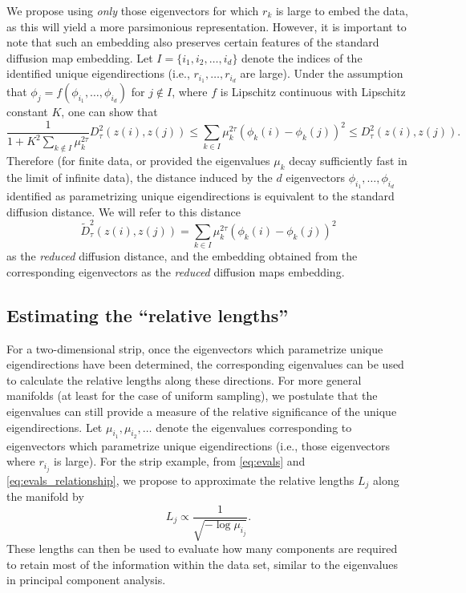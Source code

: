\documentclass[3p]{elsarticle}
\begin{document}
We propose using {\em only} those eigenvectors for which $r_k$ is large to embed the data,
as this will yield a more parsimonious representation.
%
However, it is important to note that such an embedding also preserves certain features of the standard diffusion map embedding.
%
Let $I = \{i_1, i_2, \dots, i_d \}$ denote the indices of the identified unique eigendirections (i.e., $r_{i_1}, \dots, r_{i_d}$ are large).
%
Under the assumption that $\phi_j = f \left( \phi_{i_1}, \dots, \phi_{i_d} \right)$ for $j \not\in I$, where $f$ is Lipschitz continuous with Lipschitz constant $K$, one can show that
\begin{equation}
\frac{1}{1+K^2 \sum_{k \not\in I} \mu_k^{2\tau}} D^2_\tau(z(i), z(j)) \le \sum_{k \in I} \mu_k^{2 \tau} \left( \phi_k(i) - \phi_k(j)  \right)^2 \le D^2_\tau(z(i), z(j)).
\end{equation}
%
Therefore (for finite data, or provided the eigenvalues $\mu_k$ decay sufficiently fast in the limit of infinite data),
the distance induced by the $d$ eigenvectors $\phi_{i_1}, \dots, \phi_{i_d}$ identified as
parametrizing unique eigendirections is equivalent to the standard diffusion distance.
%
We will refer to this distance
\begin{equation}
\tilde{D}^2_\tau(z(i), z(j)) = \sum_{k \in I} \mu_k^{2 \tau} \left( \phi_k(i) - \phi_k(j)  \right)^2
\end{equation}
%
as the {\em reduced} diffusion distance,
and the embedding obtained from the corresponding eigenvectors as the {\em reduced} diffusion maps embedding.
%

\subsection{Estimating the ``relative lengths''} \label{sec:relative_lengths}

For a two-dimensional strip, once the eigenvectors which parametrize unique eigendirections have been determined,
the corresponding eigenvalues can be used to calculate the relative lengths along these directions.
%
For more general manifolds (at least for the case of uniform sampling), we postulate that the eigenvalues can still provide a measure of the relative
significance of the unique eigendirections.
%
Let $\mu_{i_1}, \mu_{i_2}, \dots$ denote the eigenvalues corresponding to
eigenvectors which parametrize unique eigendirections (i.e., those eigenvectors where $r_{i_j}$ is large).
%
For the strip example, from \eqref{eq:evals} and \eqref{eq:evals_relationship}, we propose to approximate the relative lengths $L_j$  along the manifold by
\begin{equation} \label{eq:est_lengths}
L_j \propto \frac{1}{\sqrt{-\log \mu_{i_j}}}.
\end{equation}
%
These lengths can then be used to evaluate how many components are required to retain
most of the information within the data set, similar to the eigenvalues in principal component analysis.
\end{document}
